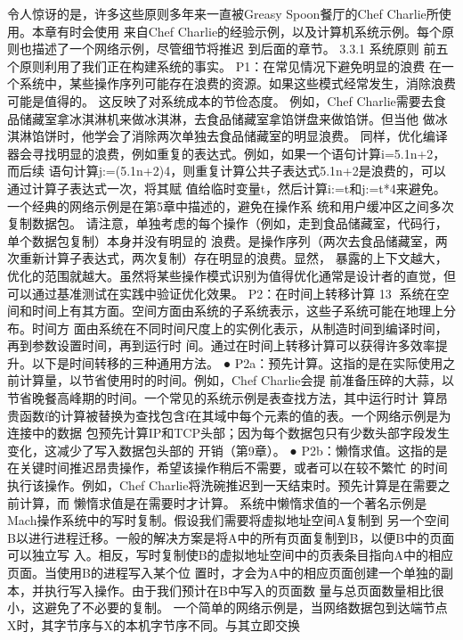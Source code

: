 令人惊讶的是，许多这些原则多年来一直被Greasy Spoon餐厅的Chef Charlie所使用。本章有时会使用
来自Chef Charlie的经验示例，以及计算机系统示例。每个原则也描述了一个网络示例，尽管细节将推迟
到后面的章节。
3.3.1 系统原则
前五个原则利用了我们正在构建系统的事实。
P1：在常见情况下避免明显的浪费
在一个系统中，某些操作序列可能存在浪费的资源。如果这些模式经常发生，消除浪费可能是值得的。
这反映了对系统成本的节俭态度。
例如，Chef Charlie需要去食品储藏室拿冰淇淋机来做冰淇淋，去食品储藏室拿馅饼盘来做馅饼。但当他
做冰淇淋馅饼时，他学会了消除两次单独去食品储藏室的明显浪费。
同样，优化编译器会寻找明显的浪费，例如重复的表达式。例如，如果一个语句计算i=5.1n+2，而后续
语句计算j:=(5.1n+2)4，则重复计算公共子表达式5.1n+2是浪费的，可以通过计算子表达式一次，将其赋
值给临时变量t，然后计算i:=t和j:=t*4来避免。一个经典的网络示例是在第5章中描述的，避免在操作系
统和用户缓冲区之间多次复制数据包。
请注意，单独考虑的每个操作（例如，走到食品储藏室，代码行，单个数据包复制）本身并没有明显的
浪费。是操作序列（两次去食品储藏室，两次重新计算子表达式，两次复制）存在明显的浪费。显然，
暴露的上下文越大，优化的范围就越大。虽然将某些操作模式识别为值得优化通常是设计者的直觉，但
可以通过基准测试在实践中验证优化效果。
P2：在时间上转移计算
                                                       13
系统在空间和时间上有其方面。空间方面由系统的子系统表示，这些子系统可能在地理上分布。时间方
面由系统在不同时间尺度上的实例化表示，从制造时间到编译时间，再到参数设置时间，再到运行时
间。通过在时间上转移计算可以获得许多效率提升。以下是时间转移的三种通用方法。
 ● P2a：预先计算。这指的是在实际使用之前计算量，以节省使用时的时间。例如，Chef Charlie会提
   前准备压碎的大蒜，以节省晚餐高峰期的时间。一个常见的系统示例是表查找方法，其中运行时计
   算昂贵函数f的计算被替换为查找包含f在其域中每个元素的值的表。一个网络示例是为连接中的数据
   包预先计算IP和TCP头部；因为每个数据包只有少数头部字段发生变化，这减少了写入数据包头部的
   开销（第9章）。
 ● P2b：懒惰求值。这指的是在关键时间推迟昂贵操作，希望该操作稍后不需要，或者可以在较不繁忙
   的时间执行该操作。例如，Chef Charlie将洗碗推迟到一天结束时。预先计算是在需要之前计算，而
   懒惰求值是在需要时才计算。
系统中懒惰求值的一个著名示例是Mach操作系统中的写时复制。假设我们需要将虚拟地址空间A复制到
另一个空间B以进行进程迁移。一般的解决方案是将A中的所有页面复制到B，以便B中的页面可以独立写
入。相反，写时复制使B的虚拟地址空间中的页表条目指向A中的相应页面。当使用B的进程写入某个位
置时，才会为A中的相应页面创建一个单独的副本，并执行写入操作。由于我们预计在B中写入的页面数
量与总页面数量相比很小，这避免了不必要的复制。
一个简单的网络示例是，当网络数据包到达端节点X时，其字节序与X的本机字节序不同。与其立即交换
